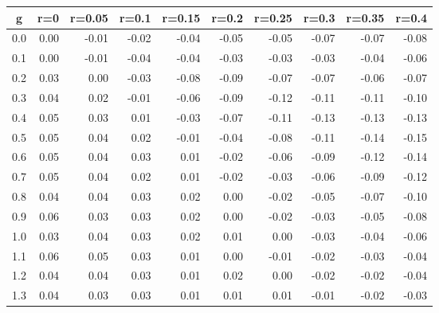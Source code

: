 %
\begin{table}[!tbp]
 \begin{center}
 \begin{tabular}{rrrrrrrrrr}\hline\hline
\multicolumn{1}{c}{g}&\multicolumn{1}{c}{r=0}&\multicolumn{1}{c}{r=0.05}&\multicolumn{1}{c}{r=0.1}&\multicolumn{1}{c}{r=0.15}&\multicolumn{1}{c}{r=0.2}&\multicolumn{1}{c}{r=0.25}&\multicolumn{1}{c}{r=0.3}&\multicolumn{1}{c}{r=0.35}&\multicolumn{1}{c}{r=0.4}\tabularnewline
\hline
0.0&0.00&-0.01&-0.02&-0.04&-0.05&-0.05&-0.07&-0.07&-0.08\tabularnewline
0.1&0.00&-0.01&-0.04&-0.04&-0.03&-0.03&-0.03&-0.04&-0.06\tabularnewline
0.2&0.03& 0.00&-0.03&-0.08&-0.09&-0.07&-0.07&-0.06&-0.07\tabularnewline
0.3&0.04& 0.02&-0.01&-0.06&-0.09&-0.12&-0.11&-0.11&-0.10\tabularnewline
0.4&0.05& 0.03& 0.01&-0.03&-0.07&-0.11&-0.13&-0.13&-0.13\tabularnewline
0.5&0.05& 0.04& 0.02&-0.01&-0.04&-0.08&-0.11&-0.14&-0.15\tabularnewline
0.6&0.05& 0.04& 0.03& 0.01&-0.02&-0.06&-0.09&-0.12&-0.14\tabularnewline
0.7&0.05& 0.04& 0.02& 0.01&-0.02&-0.03&-0.06&-0.09&-0.12\tabularnewline
0.8&0.04& 0.04& 0.03& 0.02& 0.00&-0.02&-0.05&-0.07&-0.10\tabularnewline
0.9&0.06& 0.03& 0.03& 0.02& 0.00&-0.02&-0.03&-0.05&-0.08\tabularnewline
1.0&0.03& 0.04& 0.03& 0.02& 0.01& 0.00&-0.03&-0.04&-0.06\tabularnewline
1.1&0.06& 0.05& 0.03& 0.01& 0.00&-0.01&-0.02&-0.03&-0.04\tabularnewline
1.2&0.04& 0.04& 0.03& 0.01& 0.02& 0.00&-0.02&-0.02&-0.04\tabularnewline
1.3&0.04& 0.03& 0.03& 0.01& 0.01& 0.01&-0.01&-0.02&-0.03\tabularnewline
\hline
\end{tabular}

\end{center}

\end{table}

